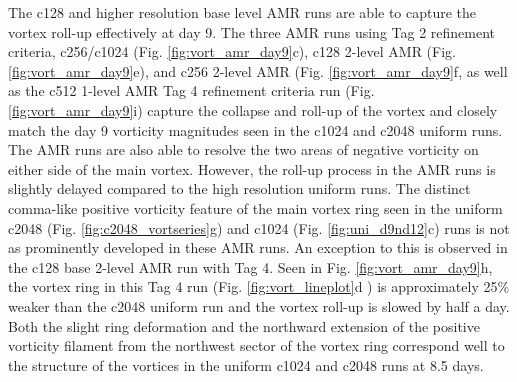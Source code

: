 \documentclass{ametsoc}
\begin{document}
The c128 and higher resolution base level AMR runs are able to capture the vortex roll-up
effectively at day 9. The three AMR runs using Tag 2 refinement criteria, 
c256/c1024 (Fig. \ref{fig:vort_amr_day9}c), c128 2-level AMR
(Fig. \ref{fig:vort_amr_day9}e), and c256 2-level AMR (Fig. \ref{fig:vort_amr_day9}f,
as well as the c512 1-level AMR Tag 4 refinement criteria run (Fig. \ref{fig:vort_amr_day9}i)
capture the collapse and roll-up of the vortex and closely match the day 9 vorticity magnitudes
seen in the c1024 and c2048 uniform runs.
The AMR runs are also able to resolve  the two areas of negative vorticity 
on either side of the main vortex. However, the roll-up process in the AMR runs is slightly
delayed compared to the high resolution uniform runs. The distinct comma-like positive vorticity 
feature of the main vortex ring seen in the uniform c2048 (Fig. \ref{fig:c2048_vortseries}g) and c1024 (Fig. \ref{fig:uni_d9nd12}c) runs
is not as prominently developed in these AMR runs. 
An exception to this is observed in the c128 base 2-level AMR run with Tag 4. Seen in
Fig. \ref{fig:vort_amr_day9}h, the vortex ring in this Tag 4 run (Fig. \ref{fig:vort_lineplot}d )
is approximately 25\% weaker than the c2048 uniform run and the vortex
roll-up is slowed by half a day. Both the slight ring deformation and the northward extension of the positive vorticity filament 
from the northwest sector of the vortex ring correspond well to the structure of
the vortices in the uniform c1024 and c2048 runs at 8.5 days. 
\end{document}
